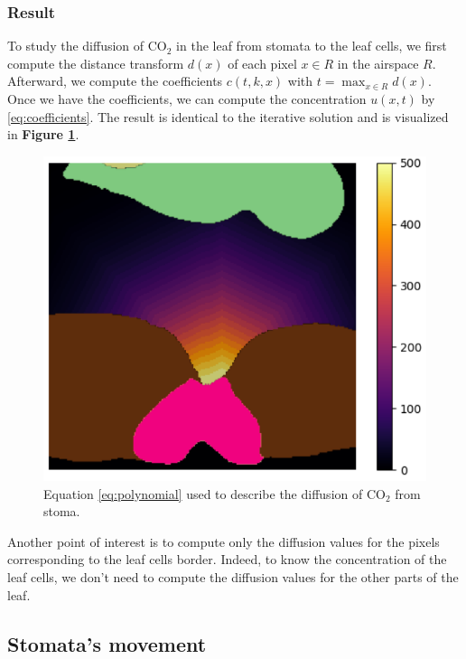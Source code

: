 \subsubsection{Result}

To study the diffusion of $\mathrm{CO_2}$ in the leaf from stomata to the leaf cells,
we first compute the distance transform $d(x)$ of each pixel $x \in R$ in the airspace $R$.
Afterward, we compute the coefficients $c(t,k,x)$ with $t = \max_{x \in R}d(x)$.
Once we have the coefficients, we can compute the concentration $u(x,t)$ by
\eqref{eq:coefficients}. The result is identical to the iterative solution and is visualized
in \textbf{Figure \ref{fig:diffusion}}.

\begin{figure}[ht]
    \centering
    \includegraphics[width=0.75\linewidth]{figures/diffusion.pdf}
    \caption{Equation \eqref{eq:polynomial} used to describe the diffusion of $\mathrm{CO_2}$ from 
    stoma.}
    \label{fig:diffusion}
\end{figure}

Another point of interest is to compute only the diffusion values for the pixels corresponding to
the leaf cells border. Indeed, to know the concentration of the leaf cells, we don't need to 
compute the diffusion values for the other parts of the leaf.

\subsection{Stomata's movement}
\label{sec:stomata}

